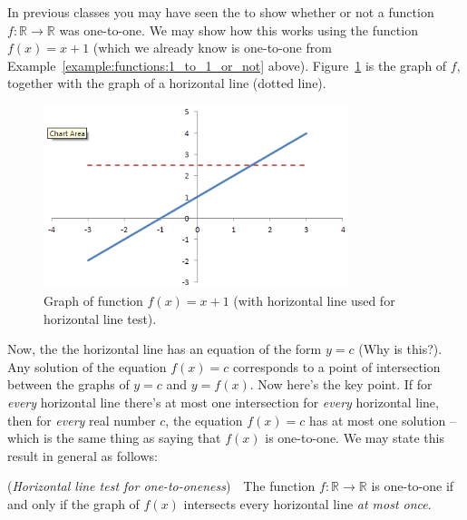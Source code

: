 \begin{rem}\label{rem:onetoone}
In previous classes you may have seen the   to show whether or not a function $f: \mathbb{R} \rightarrow \mathbb{R}$ was one-to-one.  We may show how this works using the function $f(x)=x +1$ (which we already know is one-to-one from Example~\ref{example:functions:1_to_1_or_not} above).  Figure~\ref{fig:xplus1} is the graph of $f$, together with the graph of a  horizontal line (dotted line).
\begin{figure}[h]
\includegraphics[width=3.5in]{images/xplus1.png}
\caption{Graph of function $f(x)=x +1$ (with horizontal line used for horizontal line test).}
\label{fig:xplus1}
\end{figure}

Now, the  the horizontal line has an equation of the form $y=c$ (Why is this?). Any solution of the equation $f(x)=c$ corresponds to a point of intersection between the graphs of $y=c$ and $y=f(x)$. Now here's the key point.  If for \emph{every} horizontal line there's at most one intersection for \emph{every} horizontal line, then  for \emph{every} real number $c$, the equation $f(x)=c$ has at most one solution --which is the same thing as saying that $f(x)$ is one-to-one. We may state this result in general as follows:
\bigskip

\noindent 
(\emph{Horizontal line test for one-to-oneness})~~The function $f:\mathbb{R} \rightarrow \mathbb{R}$ is one-to-one if and only if the graph of $f(x)$ intersects every horizontal line \emph{at most once}.
\bigskip


\end{rem}

